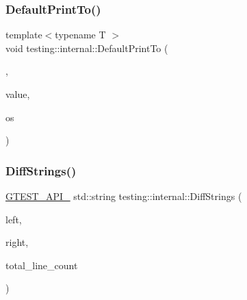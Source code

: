 \subsubsection{\texorpdfstring{DefaultPrintTo()}{DefaultPrintTo()}\hspace{0.1cm}{\footnotesize\ttfamily [4/4]}}
{\footnotesize\ttfamily template$<$typename T $>$ \\
void testing\+::internal\+::\+Default\+Print\+To (\begin{DoxyParamCaption}\item[{\mbox{\hyperlink{structtesting_1_1internal_1_1WrapPrinterType}{Wrap\+Printer\+Type}}$<$ \mbox{\hyperlink{namespacetesting_1_1internal_a17fb8f0125fa92404a249ed38a43faa4a6f88d77d9d763d8a009caf950cfbab28}{k\+Print\+Other}} $>$}]{,  }\item[{const T \&}]{value,  }\item[{\+::std\+::ostream $\ast$}]{os }\end{DoxyParamCaption})}

\mbox{\label{namespacetesting_1_1internal_a513107ff8defa97d949937fc1350a56c}} 
\subsubsection{\texorpdfstring{DiffStrings()}{DiffStrings()}}
{\footnotesize\ttfamily \mbox{\hyperlink{gtest-port_8h_aa73be6f0ba4a7456180a94904ce17790}{G\+T\+E\+S\+T\+\_\+\+A\+P\+I\+\_\+}} std\+::string testing\+::internal\+::\+Diff\+Strings (\begin{DoxyParamCaption}\item[{const std\+::string \&}]{left,  }\item[{const std\+::string \&}]{right,  }\item[{size\+\_\+t $\ast$}]{total\+\_\+line\+\_\+count }\end{DoxyParamCaption})}

\mbox{\label{namespacetesting_1_1internal_a4f70b36c624b54c2362aeecc2f05ee8c}} 
